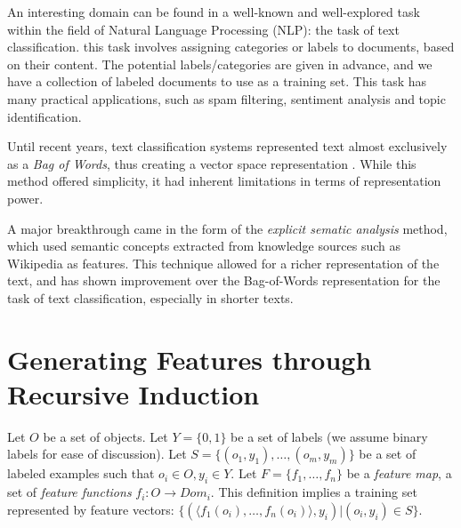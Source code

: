 \documentclass{article}
\theoremstyle{definition}
\begin{document}
An interesting domain can be found in a well-known and well-explored task within the field of Natural Language Processing (NLP): the task of text classification.
this task involves assigning categories or labels to documents, based on their content. The potential labels/categories are given in advance, and we have a collection of labeled documents to use as a training set. This task has many practical applications, such as spam filtering, sentiment analysis and topic identification.

Until recent years, text classification systems represented text almost exclusively as a \emph{Bag of Words}, thus creating a vector space representation \citep{Wu:1981:CST:1013228.511759, salton1983introduction}. While this method offered simplicity, it had inherent limitations in terms of representation power.

A major breakthrough came in the form of the \emph{explicit sematic analysis} \citep{gabrilovich2009wikipedia} method, which used semantic concepts extracted from knowledge sources such as Wikipedia as features. This technique allowed for a richer representation of the text, and has shown improvement over the Bag-of-Words representation for the task of text classification, especially in shorter texts.


\section{Generating Features through Recursive Induction}

Let $O$ be a set of objects. Let $Y=\{0,1\}$ be a set of labels (we assume binary labels for ease of discussion). Let $S=\{(o_{1},y_{1}),\ldots,(o_{m},y_{m})\}$ be a set of labeled examples such that $o_{i}\in O, y_{i}\in Y$. Let $F=\{f_{1},\ldots,f_{n}\}$ be a \emph{feature map}, a set of \emph{feature functions} $f_{i}:O\rightarrow Dom_{i}$.  This definition implies a training set represented by feature vectors: $\{ (\langle f_1(o_i),\ldots,f_n(o_i)\rangle, y_i) | (o_i,y_i) \in S\}$.
\end{document}
